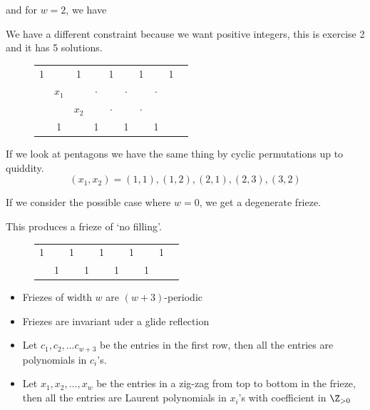 \documentclass{article}
\begin{document}
and for $w = 2$, we have
\begin{eg}
  We have a different constraint because we want positive integers, this is exercise 2 and it has 5 solutions.
  \begin{figure}[!ht]
  \centering
  \begin{tabular}{cccccccccc}
   1&&1&&1&&1&&1& \\
   &$x_1$&&$\cdot$&&$\cdot$&&$\cdot$&&\\
   &&$x_2$&&$\cdot$&&$\cdot$&&\\
   &1&&1&&1&&1&& \\
  \end{tabular}
  \end{figure}
  If we look at pentagons we have the same thing by cyclic permutations up to quiddity.
  $$ (x_1, x_2) = (1, 1) ,(1, 2), (2, 1), (2, 3), (3, 2) $$
\end{eg}

If we consider the possible case where $w = 0$, we get a degenerate frieze.

\begin{eg}
  This produces a frieze of `no filling'.
  \begin{figure}[!ht]
  \centering
  \begin{tabular}{cccccccccc}
   1&&1&&1&&1&&1& \\
   &1&&1&&1&&1&& \\
  \end{tabular}
  \end{figure}
\end{eg}

\begin{nthm}[Thm 1]
  \begin{itemize}
    \item Friezes of width $w$ are $(w + 3)$-periodic
    \item Friezes are invariant uder a glide reflection
    \item Let $c_1, c_2, \dots c_{w+3}$ be the entries in the first row, then all the entries are polynomials in $c_i$'s.
    \item Let $x_1, x_2,\dots, x_w$ be the entries in a zig-zag from top to bottom in the frieze, then all the entries are Laurent polynomials in $x_i$'s with coefficient in $\Z_{>0}$
  \end{itemize}
\end{nthm}
\end{document}
